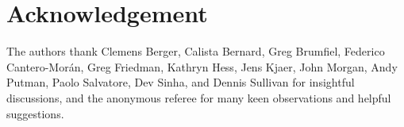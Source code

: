 \section*{Acknowledgement}

The authors thank Clemens Berger, Calista Bernard, Greg Brumfiel, Federico Cantero-Mor\'an, Greg Friedman, Kathryn Hess, Jens Kjaer, John Morgan, Andy Putman, Paolo Salvatore, Dev Sinha, and Dennis Sullivan for insightful discussions, and the anonymous referee for many keen observations and helpful suggestions.